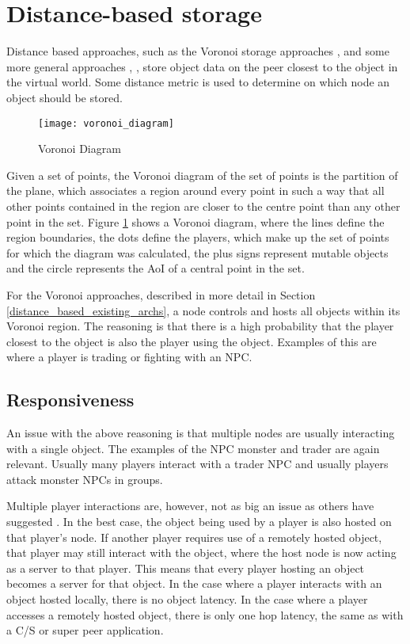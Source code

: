 \section{Distance-based storage}
\label{distance_based_storage}

Distance based approaches, such as the Voronoi storage approaches \cite{Buyukkaya_voronoi_state_management}, \cite{Hu_voronoi_IM} and some more
general approaches \cite{colyseus_distance_based}, \cite{solipsis}, store object data on the peer closest to the object in the virtual world. Some
distance metric is used to determine on which node an object should be stored.

\begin{figure}[htbp]
 \centering
 \texttt{[image: voronoi\_diagram]}
 \caption{Voronoi Diagram \cite{Buyukkaya_voronoi_state_management}}
 \label{fig_voronoi_diagram}
\end{figure}
%
Given a set of points, the Voronoi diagram of the set of points is the partition of the plane, which associates a region around every point in such a
way that all other points contained in the region are closer to the centre point than any other point in the set. Figure \ref{fig_voronoi_diagram}
shows a Voronoi diagram, where the lines define the region boundaries, the dots define the players, which make up the set of points for which the
diagram was calculated, the plus signs represent mutable objects and the circle represents the AoI of a central point in the set.

For the Voronoi approaches, described in more detail in Section \ref{distance_based_existing_archs}, a node controls and hosts all objects within its
Voronoi region. The reasoning is that there is a high probability that the player closest to the object is also the player using the object. Examples
of this are where a player is trading or fighting with an NPC.

\subsection{Responsiveness}

An issue with the above reasoning is that multiple nodes are usually interacting with a single object. The examples of the NPC monster and trader are
again relevant. Usually many players interact with a trader NPC and usually players attack monster NPCs in groups.

Multiple player interactions are, however, not as big an issue as others have suggested \cite{Fan_deisgn_issues_p2p}. In the best case, the object
being used by a player is also hosted on that player's node. If another player requires use of a remotely hosted object, that player may still
interact with the object, where the host node is now acting as a server to that player. This means that every player hosting an object becomes a
server for that object. In the case where a player interacts with an object hosted locally, there is no object latency. In the case where a player
accesses a remotely hosted object, there is only one hop latency, the same as with a C/S or super peer application.

